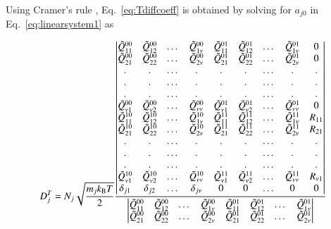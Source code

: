 \documentclass{warpdoc}
\begin{document}
Using Cramer's rule \cite{book:1964:hirschfelder}, Eq.\ \ref{eq:Tdiffcoeff} is obtained by solving for $a_{j0}$ in Eq.\ \ref{eq:linearsystem1} as

\begin{equation}
  D_j^T=N_j \sqrt{\frac{m_j k_{\rm B} T}{2}} \frac{\begin{vmatrix} 
    \Tilde{Q}^{00}_{11} & \Tilde{Q}^{00}_{12} & \dots & \Tilde{Q}^{00}_{1 \nu} & \Tilde{Q}^{01}_{11} & \Tilde{Q}^{01}_{12} & \dots & \Tilde{Q}^{01}_{1 \nu} & 0 \\
    \Tilde{Q}^{00}_{21} & \Tilde{Q}^{00}_{22} & \dots & \Tilde{Q}^{00}_{2 \nu} & \Tilde{Q}^{01}_{21} & \Tilde{Q}^{01}_{22} & \dots & \Tilde{Q}^{01}_{2 \nu} & 0 \\
    . & . & \dots & . & . & . & \dots & . & . \\
    . & . & \dots & . & . & . & \dots & . & . \\
    . & . & \dots & . & . & . & \dots & . & . \\
    \Tilde{Q}^{00}_{\nu 1} & \Tilde{Q}^{00}_{\nu 2} & \dots & \Tilde{Q}^{00}_{\nu \nu} & \Tilde{Q}^{01}_{\nu 1} & \Tilde{Q}^{01}_{\nu 2} & \dots & \Tilde{Q}^{01}_{\nu \nu} & 0 \\
    \Tilde{Q}^{10}_{11} & \Tilde{Q}^{10}_{12} & \dots & \Tilde{Q}^{10}_{1 \nu} & \Tilde{Q}^{11}_{11} & \Tilde{Q}^{11}_{12} & \dots & \Tilde{Q}^{11}_{1 \nu} & R_{11} \\
    \Tilde{Q}^{10}_{21} & \Tilde{Q}^{10}_{22} & \dots & \Tilde{Q}^{10}_{2 \nu} & \Tilde{Q}^{11}_{21} & \Tilde{Q}^{11}_{22} & \dots & \Tilde{Q}^{11}_{2 \nu} & R_{21} \\
    . & . & \dots & . & . & . & \dots & . & . \\
    . & . & \dots & . & . & . & \dots & . & . \\
    . & . & \dots & . & . & . & \dots & . & . \\
    \Tilde{Q}^{10}_{\nu 1} & \Tilde{Q}^{10}_{\nu 2} & \dots & \Tilde{Q}^{10}_{\nu \nu} & \Tilde{Q}^{11}_{\nu 1} & \Tilde{Q}^{11}_{\nu 2} & \dots & \Tilde{Q}^{11}_{\nu \nu} & R_{\nu 1} \\
    \delta_{j1} & \delta_{j2} & \dots & \delta_{j \nu} & 0 & 0 & \dots & 0 & 0
    \end{vmatrix}}{\begin{vmatrix} 
    \Tilde{Q}^{00}_{11} & \Tilde{Q}^{00}_{12} & \dots & \Tilde{Q}^{00}_{1 \nu} & \Tilde{Q}^{01}_{11} & \Tilde{Q}^{01}_{12} & \dots & \Tilde{Q}^{01}_{1 \nu}  \\
    \Tilde{Q}^{00}_{21} & \Tilde{Q}^{00}_{22} & \dots & \Tilde{Q}^{00}_{2 \nu} & \Tilde{Q}^{01}_{21} & \Tilde{Q}^{01}_{22} & \dots & \Tilde{Q}^{01}_{2 \nu}  \\

\end{vmatrix}}
\end{equation}
\end{document}
